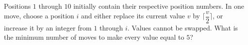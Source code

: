 Positions $1$ through $10$ initially contain their respective position numbers. In one move, choose a position $i$ and either replace its current value $v$ by $\lceil\dfrac{v}{2}\rceil$, or increase it by an integer from $1$ through $i$. Values cannot be swapped. What is the minimum number of moves to make every value equal to $5$?
